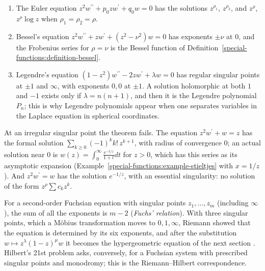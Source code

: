 \begin{example}\label{special-functions:example-frobenius}
\begin{enumerate}
\item The Euler equation $z^2w^{\prime\prime} + p_0zw^{\prime} + q_0w = 0$ has the solutions $z^{\rho_1}$, $z^{\rho_2}$, and $z^\rho$, $z^\rho\log z$ when $\rho_1 = \rho_2 = \rho$.
\item Bessel's equation $z^2w^{\prime\prime} + zw^{\prime} + (z^2 - \nu^2)w = 0$ has exponents $\pm\nu$ at $0$, and the Frobenius series for $\rho = \nu$ is the Bessel function of Definition~\ref{special-functions:definition-bessel}.
\item Legendre's equation $(1 - z^2)w^{\prime\prime} - 2zw^{\prime} + \lambda w = 0$ has regular singular points at $\pm 1$ and $\infty$, with exponents $0, 0$ at $\pm 1$. A solution holomorphic at both $1$ and $-1$ exists only if
$\lambda = n(n + 1)$, and then it is the Legendre polynomial $P_n$; this is why Legendre polynomials appear when one separates variables in the Laplace equation in spherical coordinates.
\end{enumerate}
\end{example}

\begin{counterexample}\label{special-functions:counterexample-irregular}
At an irregular singular point the theorem fails. The equation $z^2w^{\prime} + w = z$ has the formal solution $\sum_{k \geq 0}(-1)^kk!\,z^{k+1}$, with radius of convergence $0$; an actual solution near $0$ is
$w(z) = \int_0^\infty\frac{e^{-t/z}}{1 + t}dt$ for $z > 0$, which has this series as its asymptotic expansion (Example~\ref{special-functions:example-stieltjes} with $x = 1/z$). And $z^2w^{\prime} = w$ has the solution $e^{-1/z}$,
with an essential singularity: no solution of the form $z^\rho\sum c_kz^k$.
\end{counterexample}

\begin{remark}\label{special-functions:remark-riemann-p}
For a second-order Fuchsian equation with singular points $z_1, \ldots, z_m$ (including $\infty$), the sum of all the exponents is $m - 2$ (\emph{Fuchs' relation}). With three singular points, which a M\"obius transformation
moves to $0, 1, \infty$, Riemann showed that the equation is determined by its six exponents, and after the substitution $w \mapsto z^\lambda(1 - z)^\mu w$ it becomes the hypergeometric equation of the next section
\cite{whittaker-watson}. Hilbert's 21st problem asks, conversely, for a Fuchsian system with prescribed singular points and monodromy; this is the Riemann--Hilbert correspondence.
\end{remark}

